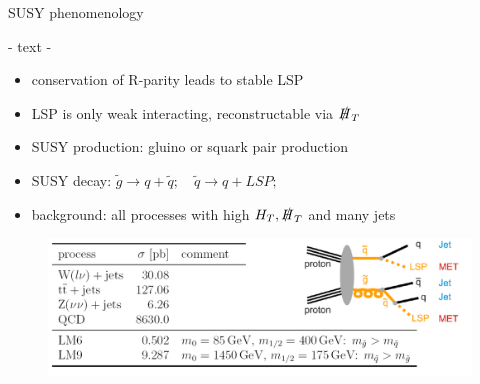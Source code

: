 

\begin{frame}{SUSY phenomenology}
	\begin{block}{ - text - }
		\begin{itemize}
\item conservation of R-parity leads to stable LSP\\
\item LSP is only weak interacting, reconstructable via $\slashed{H}_T$ \\
\item SUSY production: \quad gluino or squark pair production\\
\item SUSY decay: \quad $\tilde{g} \rightarrow q +\tilde{q};\quad  \tilde{q} \rightarrow q + LSP;$\\ 
\item background: all processes with high $H_T, \slashed{H}_T$ and many jets
		\end{itemize}
	\end{block}

	\begin{figure}[H]
	\centering
	 \includegraphics[width=\textwidth,]{figures/feynman+bkg.png}
	\end{figure}
\end{frame}

